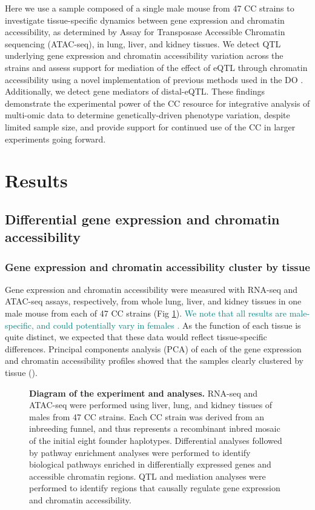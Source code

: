 \documentclass[10pt,letterpaper]{article}
\newcommand{\GKinline}[1]{\textcolor{teal}{#1}}
\begin{document}
Here we use a sample composed of a single male mouse from 47 CC strains to investigate tissue-specific dynamics between gene expression and chromatin accessibility, as determined by Assay for Transposase Accessible Chromatin sequencing (ATAC-seq), in lung, liver, and kidney tissues. We detect QTL underlying gene expression and chromatin accessibility variation across the strains and assess support for mediation of the effect of eQTL through chromatin accessibility using a novel implementation of previous methods used in the DO \cite{Chick2016}. Additionally, we detect gene mediators of distal-eQTL. 
These findings demonstrate the experimental power of the CC resource for integrative analysis of multi-omic data to determine genetically-driven phenotype variation, despite limited sample size, and provide support for continued use of the CC in larger experiments going forward.

\section*{Results}
\subsection*{Differential gene expression and chromatin accessibility}

\subsubsection*{Gene expression and chromatin accessibility cluster by tissue}
Gene expression and chromatin accessibility were measured with RNA-seq and ATAC-seq assays, respectively, from whole lung, liver, and kidney tissues in one male mouse from each of 47 CC strains (Fig \ref{fig:overview}). \GKinline{We note that all results are male-specific, and could potentially vary in females \cite{Chick2016}.} As the function of each tissue is quite distinct, we expected that these data would reflect tissue-specific differences. Principal components analysis (PCA) of each of the gene expression and chromatin accessibility profiles showed that the samples clearly clustered by tissue (). 

\begin{figure}[!h]
\caption{{\bf Diagram of the experiment and analyses.}
RNA-seq and ATAC-seq were performed using liver, lung, and kidney tissues of males from 47 CC strains. Each CC strain was derived from an inbreeding funnel, and thus represents a recombinant inbred mosaic of the initial eight founder haplotypes. Differential analyses followed by pathway enrichment analyses were performed to identify biological pathways enriched in differentially expressed genes and accessible chromatin regions. QTL and mediation analyses were performed to identify regions that causally regulate gene expression and chromatin accessibility.}
\label{fig:overview}
\end{figure}
\end{document}
